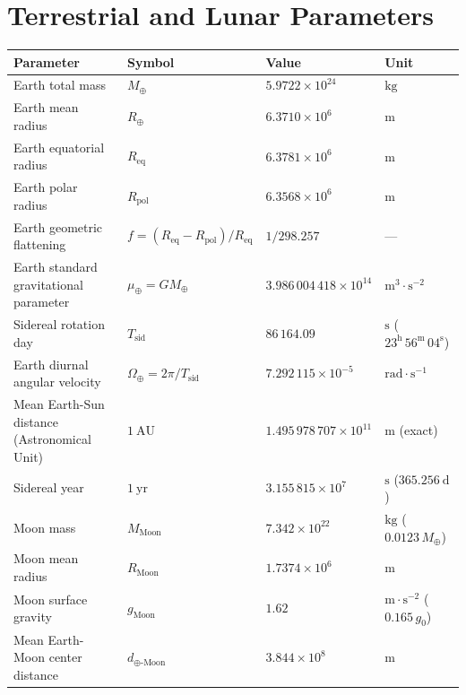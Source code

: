 \section{Terrestrial and Lunar Parameters}

\begin{center}
\renewcommand{\arraystretch}{1.3}
\begin{tabular}{@{}llll@{}}
\toprule
\textbf{Parameter} & \textbf{Symbol} & \textbf{Value} & \textbf{Unit} \\
\midrule
Earth total mass & $M_\oplus$ & $5.9722 \times 10^{24}$ & $\mathrm{kg}$ \\
Earth mean radius & $R_\oplus$ & $6.3710 \times 10^6$ & $\mathrm{m}$ \\
Earth equatorial radius & $R_{\text{eq}}$ & $6.3781 \times 10^6$ & $\mathrm{m}$ \\
Earth polar radius & $R_{\text{pol}}$ & $6.3568 \times 10^6$ & $\mathrm{m}$ \\
Earth geometric flattening & $f = (R_{\text{eq}} - R_{\text{pol}})/R_{\text{eq}}$ & $1/298.257$ & --- \\
Earth standard gravitational parameter & $\mu_\oplus = G M_\oplus$ & $3.986\,004\,418 \times 10^{14}$ & $\mathrm{m^3\cdot s^{-2}}$ \\
Sidereal rotation day & $T_{\text{sid}}$ & $86\,164.09$ & $\mathrm{s}$ ($23^\mathrm{h}\,56^\mathrm{m}\,04^\mathrm{s}$) \\
Earth diurnal angular velocity & $\Omega_\oplus = 2\pi/T_{\text{sid}}$ & $7.292\,115 \times 10^{-5}$ & $\mathrm{rad\cdot s^{-1}}$ \\
Mean Earth-Sun distance (Astronomical Unit) & $1\ \mathrm{AU}$ & $1.495\,978\,707 \times 10^{11}$ & $\mathrm{m}$ (exact) \\
Sidereal year & $1\ \mathrm{yr}$ & $3.155\,815 \times 10^7$ & $\mathrm{s}$ ($365.256\ \mathrm{d}$) \\
\midrule
Moon mass & $M_{\text{Moon}}$ & $7.342 \times 10^{22}$ & $\mathrm{kg}$ ($0.0123\,M_\oplus$) \\
Moon mean radius & $R_{\text{Moon}}$ & $1.7374 \times 10^6$ & $\mathrm{m}$ \\
Moon surface gravity & $g_{\text{Moon}}$ & $1.62$ & $\mathrm{m\cdot s^{-2}}$ ($0.165\,g_0$) \\
Mean Earth-Moon center distance & $d_{\oplus\text{-Moon}}$ & $3.844 \times 10^8$ & $\mathrm{m}$ \\
\bottomrule
\end{tabular}
\end{center}

